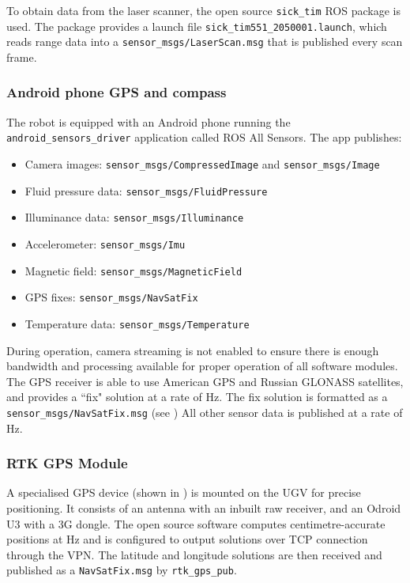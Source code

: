 \documentclass[titlepage,12pt,a4paper]{article}
\begin{document}
To obtain data from the laser scanner, the open source \verb|sick_tim| ROS package is used. The package provides a launch file \verb|sick_tim551_2050001.launch|, which reads range data into a \verb|sensor_msgs/LaserScan.msg| that is published every scan frame.

\subsubsection{Android phone GPS and compass}

The robot is equipped with an Android phone running the \verb|android_sensors_driver| application called ROS All Sensors. The app publishes:

\begin{itemize}
	\item Camera images: \verb|sensor_msgs/CompressedImage| and \verb|sensor_msgs/Image|
	\item Fluid pressure data: \verb|sensor_msgs/FluidPressure|
	\item Illuminance data: \verb|sensor_msgs/Illuminance|
	\item Accelerometer: \verb|sensor_msgs/Imu|
	\item Magnetic field: \verb|sensor_msgs/MagneticField|
	\item GPS fixes: \verb|sensor_msgs/NavSatFix|
	\item Temperature data: \verb|sensor_msgs/Temperature| \\
\end{itemize}

During operation, camera streaming is not enabled to ensure there is enough bandwidth and processing available for proper operation of all software modules. The GPS receiver is able to use American GPS and Russian GLONASS satellites, and provides a ``fix" solution at a rate of \unit[1]{Hz}. The fix solution is formatted as a \verb|sensor_msgs/NavSatFix.msg| (see ) All other sensor data is published at a rate of \unit[20]{Hz}.

\subsubsection{RTK GPS Module}

A specialised GPS device (shown in ) is mounted on the UGV for precise positioning. It consists of an antenna with an inbuilt raw receiver, and an Odroid U3 with a 3G dongle. The open source software computes centimetre-accurate positions at \unit[2]{Hz} and is configured to output solutions over TCP connection through the VPN. The latitude and longitude solutions are then received and published as a \verb|NavSatFix.msg| by \verb|rtk_gps_pub|.
\end{document}
